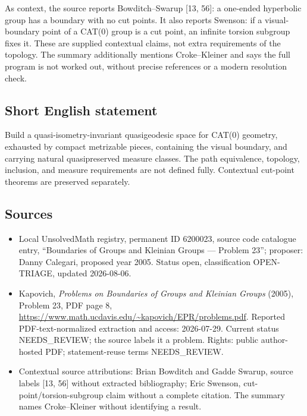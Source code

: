 \documentclass[11pt]{article}
\begin{document}
As context, the source reports Bowditch--Swarup [13, 56]: a one-ended hyperbolic group has a boundary with no cut points. It also reports Swenson: if a visual-boundary point of a CAT(0) group is a cut point, an infinite torsion subgroup fixes it. These are supplied contextual claims, not extra requirements of the topology. The summary additionally mentions Croke--Kleiner and says the full program is not worked out, without precise references or a modern resolution check.
\subsection{Short English statement}
Build a quasi-isometry-invariant quasigeodesic space for CAT(0) geometry, exhausted by compact metrizable pieces, containing the visual boundary, and carrying natural quasipreserved measure classes. The path equivalence, topology, inclusion, and measure requirements are not defined fully. Contextual cut-point theorems are preserved separately.
\subsection{Sources}
\begin{itemize}
\item Local UnsolvedMath registry, permanent ID 6200023, source code catalogue entry, ``Boundaries of Groups and Kleinian Groups --- Problem 23''; proposer: Danny Calegari, proposed year 2005. Status open, classification OPEN-TRIAGE, updated 2026-08-06.
\item Kapovich, \emph{Problems on Boundaries of Groups and Kleinian Groups} (2005), Problem 23, PDF page 8, \url{https://www.math.ucdavis.edu/~kapovich/EPR/problems.pdf}. Reported PDF-text-normalized extraction and access: 2026-07-29. Current status NEEDS\_REVIEW; the source labels it a problem. Rights: public author-hosted PDF; statement-reuse terms NEEDS\_REVIEW.
\item Contextual source attributions: Brian Bowditch and Gadde Swarup, source labels [13, 56] without extracted bibliography; Eric Swenson, cut-point/torsion-subgroup claim without a complete citation. The summary names Croke--Kleiner without identifying a result.
\end{itemize}
\end{document}
